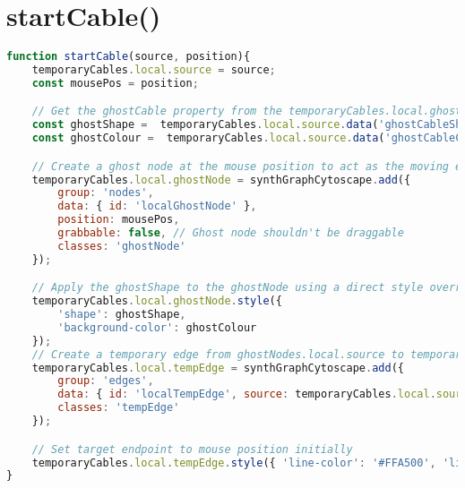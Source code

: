 \section{startCable()}
\begin{lstlisting}[language=JavaScript, caption={Function startCable() creates a temporary visual connection between a source node and the mouse position. A ghost node and dashed cable are rendered to indicate an in-progress patching action.}, label={lst:startCable-function}]
function startCable(source, position){
    temporaryCables.local.source = source;
    const mousePos = position;

    // Get the ghostCable property from the temporaryCables.local.ghostNode, default to 'ellipse' if undefined
    const ghostShape =  temporaryCables.local.source.data('ghostCableShape') || 'ellipse';
    const ghostColour =  temporaryCables.local.source.data('ghostCableColour') || '#5C9AE3';

    // Create a ghost node at the mouse position to act as the moving endpoint
    temporaryCables.local.ghostNode = synthGraphCytoscape.add({
        group: 'nodes',
        data: { id: 'localGhostNode' },
        position: mousePos,
        grabbable: false, // Ghost node shouldn't be draggable
        classes: 'ghostNode'
    });

    // Apply the ghostShape to the ghostNode using a direct style override
    temporaryCables.local.ghostNode.style({
        'shape': ghostShape,
        'background-color': ghostColour
    });
    // Create a temporary edge from ghostNodes.local.source to temporaryCables.local.ghostNode
    temporaryCables.local.tempEdge = synthGraphCytoscape.add({
        group: 'edges',
        data: { id: 'localTempEdge', source: temporaryCables.local.source.id(), target: 'localGhostNode' },
        classes: 'tempEdge'
    });

    // Set target endpoint to mouse position initially
    temporaryCables.local.tempEdge.style({ 'line-color': '#FFA500', 'line-style': 'dashed',  'source-arrow-shape': 'none'  }); // Set temporary edge color        
}
\end{lstlisting}

